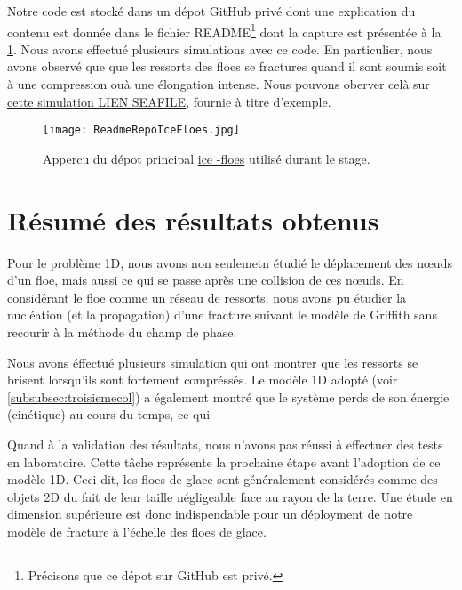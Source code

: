 Notre code est stocké dans un dépot GitHub privé dont une explication du contenu est donnée dans le fichier README\footnote{Précisons que ce dépot sur GitHub est privé.} dont la capture est présentée à la \cref{fig:readme1d}. Nous avons effectué plusieurs simulations avec ce code. En particulier, nous avons observé que que les ressorts des floes se fractures quand il sont soumis soit à une compression ouà une élongation intense. Nous pouvons oberver celà sur \href{www}{cette simulation LIEN SEAFILE}, fournie à titre d'exemple.  
\begin{figure}[!h]
    \centering
    \texttt{[image: ReadmeRepoIceFloes.jpg]}
    \caption{Appercu du dépot principal \href{https://github.com/desmond-rn/ice-floes}{ice
    -floes} utilisé durant le stage.}
    \label{fig:readme1d}
\end{figure}





\section{Résumé des résultats obtenus}


Pour le problème 1D, nous avons non seulemetn étudié le déplacement des n\oe{}uds d'un floe, mais aussi ce qui se passe après une collision de ces n\oe{}uds. En considérant le floe comme un réseau de ressorts, nous avons pu étudier la nucléation (et la propagation) d'une fracture suivant le modèle de Griffith sans recourir à la méthode du champ de phase.

Nous avons éffectué plusieurs simulation qui ont montrer que les ressorts se brisent lorsqu'ils sont fortement compréssés. Le modèle 1D adopté (voir \cref{subsubsec:troisiemecol}) a également montré que le système perds de son énergie (cinétique) au cours du temps, ce qui 

Quand à la validation des résultats, nous n'avons pas réussi à effectuer des tests en laboratoire. Cette tâche représente la prochaine étape avant l'adoption de ce modèle 1D. Ceci dit, les floes de glace sont généralement considérés comme des objets 2D du fait de leur taille négligeable face au rayon de la terre. Une étude en dimension supérieure est donc indispendable pour un déployment de notre modèle de fracture à l'échelle des floes de glace.










